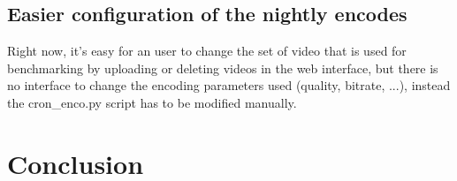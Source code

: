 \documentclass[a4paper,12pt]{article}
\begin{document}
\subsection{Easier configuration of the nightly encodes}
Right now, it's easy for an user to change the set of video that is used for
benchmarking by uploading or deleting videos in the web interface, but there is
no interface to change the encoding parameters used (quality, bitrate, ...),
instead the cron\_enco.py script has to be modified manually.

\section{Conclusion}

\appendix
{}

\end{document}
